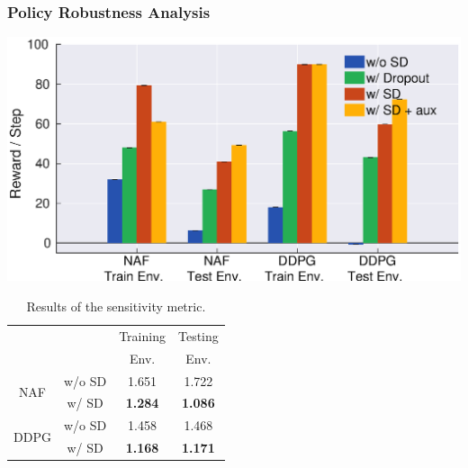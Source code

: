 \documentclass[../thesis.tex]{subfiles}
\begin{document}
 
 
\subsubsection{Policy Robustness Analysis}
 
\begin{table}[t]
  \begin{minipage}[t]{0.45\linewidth}
    \centering
    \vskip -0.1in
    \includegraphics[width=\columnwidth]{./MultimodalDRL/fig/random_sensor_failure_normalize_with_aux}
    \label{fig:random_sensor_failure}
  \end{minipage}
  \begin{minipage}[t]{0.45\linewidth}
    \vskip -0.1in
    \caption{Results of the sensitivity metric.} %
    \label{table:policy-ratio}
    \vskip 0.1in
    \centering
    \begin{small}
    \begin{sc}
    \begin{tabular}{cccc}
    \toprule
    \centering
     & & Training & Testing  \\
     & & Env. & Env. \\ \midrule \midrule
    \multirow{2}{*}{NAF}  & w/o SD & 1.651 & 1.722 \\
                          & w/ SD  & \textbf{1.284} & \textbf{1.086} \\ \midrule
    \multirow{2}{*}{DDPG} & w/o SD & 1.458 & 1.468 \\
                          & w/ SD  & \textbf{1.168} & \textbf{1.171} \\ \toprule
    \end{tabular}
    \end{sc}
    \end{small}
  \end{minipage}
\end{table}
 
\end{document}
